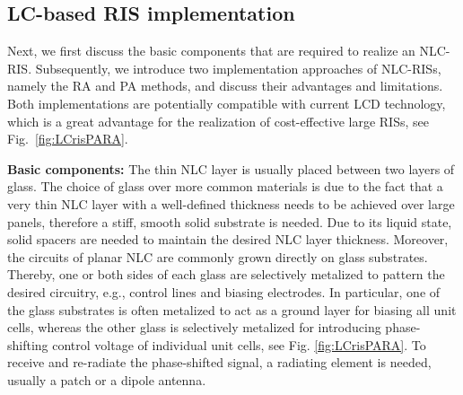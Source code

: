 \subsection{LC-based RIS implementation} \label{sec:RISimplementation}

Next, we first discuss the basic components that are required to realize an \gls{NLC}-\gls{RIS}. Subsequently, we introduce two implementation approaches of \gls{NLC}-\glspl{RIS}, namely the \gls{RA} and \gls{PA} methods, and discuss their advantages and limitations. Both implementations are potentially compatible with current \gls{LCD} technology, which is a great advantage for the realization of cost-effective large \glspl{RIS}, see Fig.~\ref{fig:LCrisPARA}.


\textbf{Basic components:}  The thin \gls{NLC} layer is usually placed between two layers of glass. 
The choice of glass over more common materials is due to the fact that a very thin \gls{NLC} layer with a well-defined thickness needs to be achieved over large panels, therefore a stiff, smooth solid substrate is needed.
Due to its liquid state, solid spacers are needed to maintain the desired \gls{NLC} layer thickness. 
Moreover, the circuits of planar \gls{NLC} are commonly grown directly on glass substrates. Thereby, one or both sides of each glass are selectively metalized to pattern the desired circuitry, e.g., control lines and biasing electrodes. In particular, one of the glass substrates is often metalized to act as a ground layer for biasing all unit cells, whereas the other glass is selectively metalized for introducing phase-shifting control voltage of individual unit cells, see Fig. \ref{fig:LCrisPARA}. 
To receive and re-radiate the phase-shifted signal, a radiating element is needed, usually a patch or a dipole antenna. 






